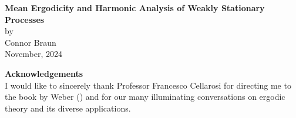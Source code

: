 \documentclass[11pt]{report}
\newcommand{\1}[1]{\mathbbm{1}_{\{#1\}}}
\theoremstyle{definition}
\begin{document}
\thispagestyle{empty}
    \begin{center}
        {\bf\large{Mean Ergodicity and Harmonic Analysis of Weakly Stationary
        Processes}}\\[5pt]
        by\\[5pt]
        Connor Braun\\[5pt]
        November, 2024
    \end{center}
    \vspace{5pt}
    \begin{center}
        \textbf{Acknowledgements}\\I would like to sincerely thank Professor Francesco Cellarosi for directing me to
        the book by Weber (\cite{Weber_2000}) and for our many illuminating conversations on ergodic theory and its diverse applications.\\[5pt]
    \end{center}
\end{document}
